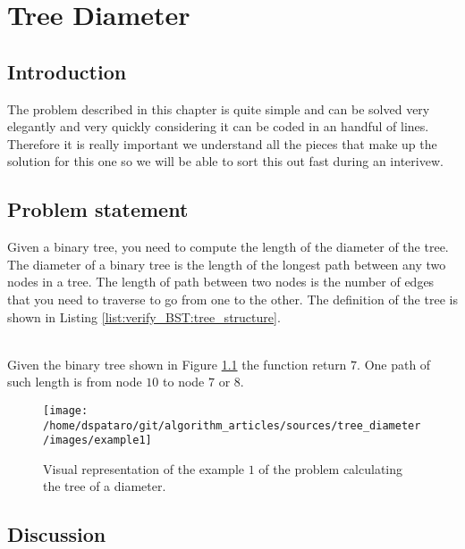 %

\chapter{Tree Diameter}
\label{ch:tree_diameter}
\section*{Introduction}
The problem described in this chapter is quite simple and can be solved very elegantly and very quickly considering it can be coded in an handful of lines. Therefore it is really important we understand all the pieces that make up the solution for this one so we will be able to sort this out fast during an interivew.

\section{Problem statement}
\begin{exercise}
 Given a binary tree, you need to compute the length of the diameter of the tree. The diameter of a binary tree is the length of the longest path between any two nodes in a tree. The length of path between two nodes is  the number of edges that you need to traverse to go from one to the other.
 The definition of the tree is shown in Listing \ref{list:verify_BST:tree_structure}.


	\begin{example}
		\hfill \\
		Given the binary tree shown in Figure \ref{fig:tree_diameter:example1} the function return $7$. One path of such length is from node $10$ to node $7$ or $8$.
	\end{example}

\end{exercise}

\begin{figure}
	\centering
	\texttt{[image: /home/dspataro/git/algorithm\_articles/sources/tree\_diameter/images/example1]}
	\caption{Visual representation of the example $1$ of the problem calculating the tree of a diameter.}
	\label{fig:tree_diameter:example1}
\end{figure}


\section{Discussion}
\label{tree_diameter:sec:discussion}


